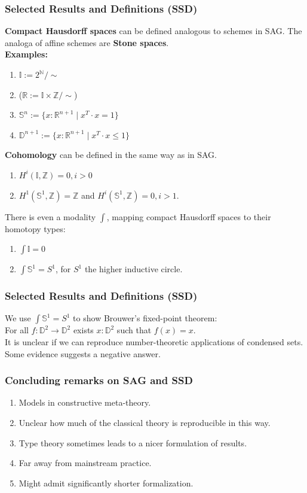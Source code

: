 \documentclass{beamer}
\begin{document}
\begin{frame}
  \frametitle{Selected Results and Definitions (SSD)}
  \textbf{Compact Hausdorff spaces} can be defined analogous to schemes in SAG.
  \pause
  The analoga of affine schemes are \textbf{Stone spaces}. \\
  \pause
  \textbf{Examples:}
  \begin{enumerate}[(1)]
  \item $\mathbb I := 2^{\mathbb N}/\sim $
  \item ($\mathbb R := \mathbb I \times \mathbb Z/\sim$)
  \item $\mathbb S^n := \{x : \mathbb R^{n+1}\mid x^T\cdot x=1\} $
  \item $\mathbb D^{n+1} := \{x : \mathbb R^{n+1}\mid x^T\cdot x\leq 1\} $
  \end{enumerate}
  \pause
  \textbf{Cohomology} can be defined in the same way as in SAG. \\
  \pause
  \begin{enumerate}[(1)]
  \item $H^i(\mathbb I, \mathbb Z)=0, i>0$
  \item $H^1(\mathbb S^1,\mathbb Z)=\mathbb Z$ and $H^i(\mathbb S^1,\mathbb Z)=0, i>1$.
  \end{enumerate}
  \pause
  There is even a modality $\int$, mapping compact Hausdorff spaces to their homotopy types:
  \begin{enumerate}[(1)]
  \item $\int \mathbb I = 0$
  \item $\int \mathbb S^1 = S^1$, for $S^1$ the higher inductive circle.
  \end{enumerate}
\end{frame}

\begin{frame}
  \frametitle{Selected Results and Definitions (SSD)}
  We use $\int \mathbb S^1=S^1$ to show Brouwer's fixed-point theorem: \\
  For all $f:\mathbb D^2\to \mathbb D^2$ exists $x:\mathbb D^2$ such that $f(x)=x$. \\
  \pause
  \vspace{2cm}
  It is unclear if we can reproduce number-theoretic applications of condensed sets.
  Some evidence suggests a negative answer.
  \vspace{2cm}
\end{frame}

\begin{frame}
  \frametitle{Concluding remarks on SAG and SSD}
  \begin{enumerate}[(1)]
  \item Models in constructive meta-theory.
  \item Unclear how much of the classical theory is reproducible in this way.
  \item Type theory sometimes leads to a nicer formulation of results.
  \item Far away from mainstream practice.
  \item Might admit significantly shorter formalization. 
  \end{enumerate}
\end{frame}
\end{document}
